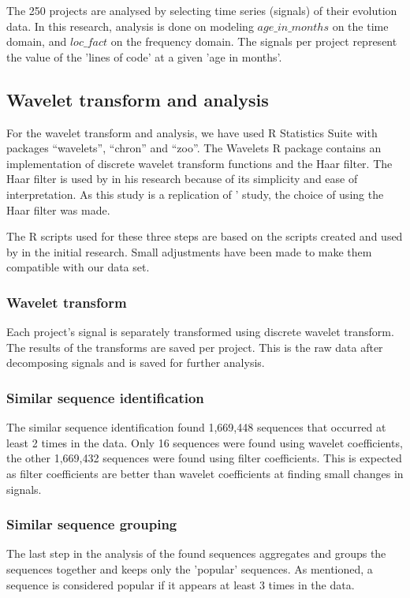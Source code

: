 The 250 projects are analysed by selecting time series (signals) of their
evolution data. In this research, analysis is done on modeling $age\_in\_months$
on the time domain, and $loc\_fact$ on the frequency domain. The signals per
project represent the value of the 'lines of code' at a given 'age in months'.

\subsection{Wavelet transform and analysis}

For the wavelet transform and analysis, we have used R Statistics Suite
with packages ``wavelets'', ``chron'' and ``zoo''. The Wavelets R package
contains an implementation of discrete wavelet transform functions and the Haar
filter. The Haar filter is used by \citet{karus2013} in his research because of
its simplicity and ease of interpretation. As this study is a replication of
\citeauthor{karus2013}' study, the choice of using the Haar filter was made.

The R scripts used for these three steps are based on the scripts created and
used by \citeauthor{karus2013} in the initial research. Small adjustments have
been made to make them compatible with our data set.

\subsubsection{Wavelet transform}
Each project's signal is separately transformed using discrete wavelet
transform. The results of the transforms are saved per project. This is the raw
data after decomposing signals and is saved for further analysis.

\subsubsection{Similar sequence identification}
The similar sequence identification found 1,669,448 sequences that occurred
at least 2 times in the data. Only 16 sequences were found using wavelet
coefficients, the other 1,669,432 sequences were found using filter
coefficients. This is expected as filter coefficients are better than wavelet
coefficients at finding small changes in signals.

\subsubsection{Similar sequence grouping}
The last step in the analysis of the found sequences aggregates and groups the
sequences together and keeps only the 'popular' sequences. As mentioned, a
sequence is considered popular if it appears at least 3 times in the data.

